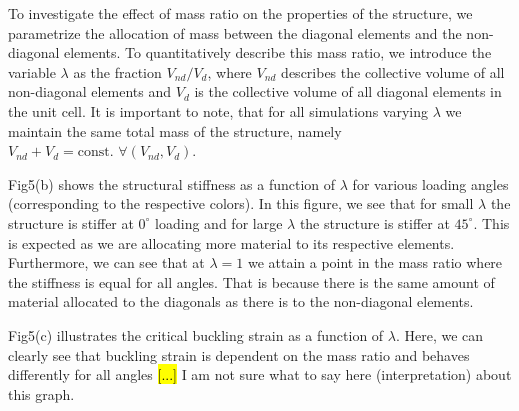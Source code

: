 \documentclass[9pt,twocolumn,twoside]{fernandes_paper}
\newcommand{\mf}[1]{\colorbox{blue!10}{\color{color3}#1}}
\begin{document}


To investigate the effect of mass ratio on the properties of the structure, we parametrize the allocation of mass between the diagonal elements and the non-diagonal elements. To quantitatively describe this mass ratio, we introduce the variable $\lambda$ as the fraction $V_{nd}/V_d$, where $V_{nd}$ describes the collective volume of all non-diagonal elements and $V_d$ is the collective volume of all diagonal elements in the unit cell. It is important to note, that for all simulations varying $\lambda$ we maintain the same total mass of the structure, namely $V_{nd}+V_d=\mbox{const. } \forall (V_{nd},V_d)$. 

{Fig5}(b) shows the structural stiffness as a function of $\lambda$ for various loading angles (corresponding to the respective colors). In this figure, we see that for small $\lambda$ the structure is stiffer at $0^\circ$ loading and for large $\lambda$ the structure is stiffer at $45^\circ$. This is expected as we are allocating more material to its respective elements. Furthermore, we can see that at $\lambda=1$ we attain a point in the mass ratio where the stiffness is equal for all angles. That is because there is the same amount of material allocated to the diagonals as there is to the non-diagonal elements.

{Fig5}(c) illustrates the critical buckling strain as a function of $\lambda$. Here, we can clearly see that buckling strain is dependent on the mass ratio and behaves differently for all angles \hl{[...]} \mf{I am not sure what to say here (interpretation) about this graph.}


\end{document}
